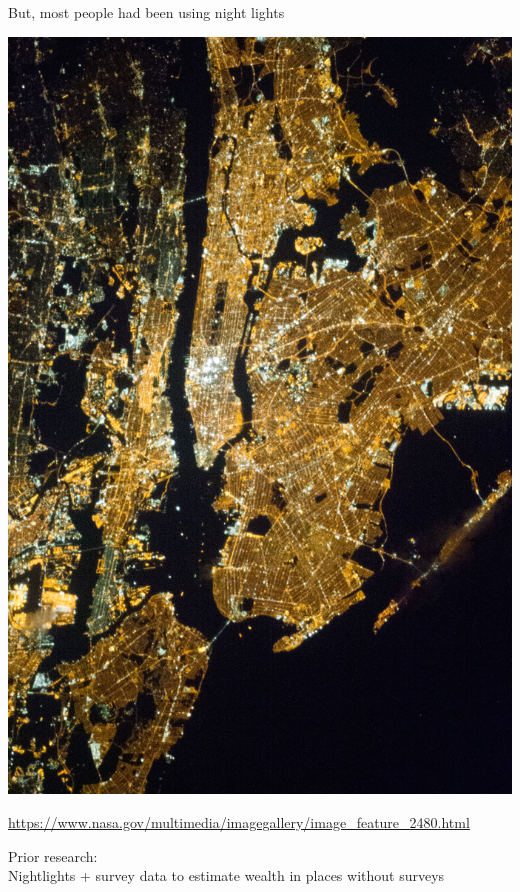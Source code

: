 \documentclass[aspectratio=169]{beamer}
\begin{document}
\begin{frame}

But, most people had been using night lights
\begin{center}
\includegraphics[height=0.7\textheight]{figures/nyc_night}
\end{center}

\vfill
\url{https://www.nasa.gov/multimedia/imagegallery/image_feature_2480.html}
\end{frame}
\begin{frame}

Prior research:\\
Nightlights + survey data to estimate wealth in places without surveys

\end{frame}
\end{document}
